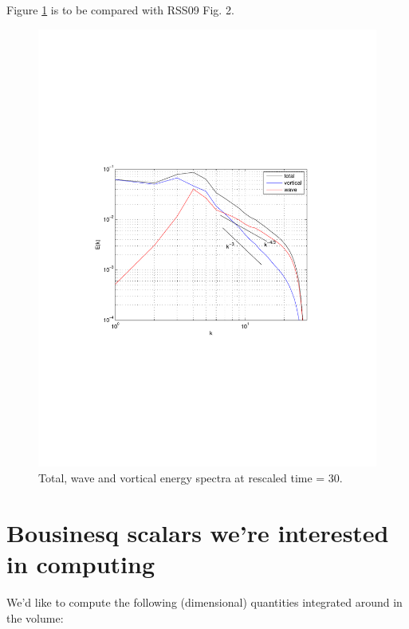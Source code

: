\documentclass[12pt]{article}
\begin{document}
Figure \ref{Fig2_H} is to be compared with RSS09 Fig. 2.
\begin{figure}[ht]
\centering
\includegraphics[scale = .7]{RSS09_Fig2_UH}
\caption{Total, wave and vortical energy spectra at rescaled time = 30.\label{Fig2_H}}
\end{figure}


\section{Bousinesq scalars we're interested in computing}

We'd like to compute the following (dimensional) quantities integrated
around in the volume:
\end{document}
